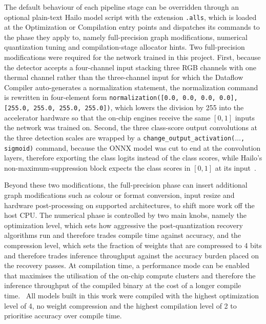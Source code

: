 \documentclass[12pt,oneside,bibtotoc,liststotoc]{scrbook}
\begin{document}
The default behaviour of each pipeline stage can be overridden
through an optional plain-text Hailo model script with the extension
\texttt{.alls}, which is loaded at the Optimization or Compilation
entry points and dispatches its commands to the phase they apply to,
namely full-precision graph modifications, numerical quantization
tuning and compilation-stage allocator
hints. Two full-precision
modifications were required for the network trained in this project.
First, because the detector accepts a four-channel input stacking
three RGB channels with one thermal channel rather than the
three-channel input for which the Dataflow Compiler auto-generates a
normalization statement, the normalization command is rewritten in
four-element form \texttt{normalization([0.0, 0.0, 0.0, 0.0], [255.0,
            255.0, 255.0, 255.0])}, which lowers the division by 255 into the
accelerator hardware so that the on-chip engines receive the same
$[0, 1]$ inputs the network was trained
on. Second, the three
class-score output convolutions at the three detection scales are
wrapped by a \texttt{change\_output\_activation($\ldots$, sigmoid)}
command, because the ONNX model was cut to end at the convolution layers,
therefore exporting the class logits instead of the class scores,
while Hailo's non-maximum-suppression
block expects the class scores in $[0, 1]$ at its
input~\cite{hailoDataflowCompilerUserGuide}.

Beyond these two modifications, the full-precision phase can insert
additional graph modifications such as colour or format conversion,
input resize and hardware post-processing on supported
architectures, to shift more work off the host
CPU. The numerical phase is
controlled by two main knobs, namely the optimization level, which
sets how aggressive the post-quantization recovery algorithms run
and therefore trades compile time against accuracy, and the
compression level, which sets the fraction of weights that are
compressed to 4 bits and therefore trades inference throughput
against the accuracy burden placed on the recovery
passes. At compilation time, a
performance mode can be enabled that maximises the utilisation of
the on-chip compute clusters and therefore the inference throughput
of the compiled binary at the cost of a longer compile
time.~\cite{hailoDataflowCompilerUserGuide} All models built in this
work were compiled with the highest optimization level of 4, no
weight compression and the highest compilation level of 2 to
prioritise accuracy over compile time.

\vspace{-1em}
\end{document}
